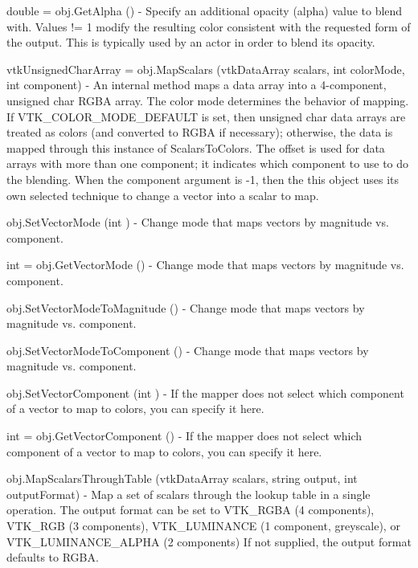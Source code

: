 \begin{DoxyItemize}
\item {\ttfamily double = obj.\-Get\-Alpha ()} -\/ Specify an additional opacity (alpha) value to blend with. Values != 1 modify the resulting color consistent with the requested form of the output. This is typically used by an actor in order to blend its opacity.  
\item {\ttfamily vtk\-Unsigned\-Char\-Array = obj.\-Map\-Scalars (vtk\-Data\-Array scalars, int color\-Mode, int component)} -\/ An internal method maps a data array into a 4-\/component, unsigned char R\-G\-B\-A array. The color mode determines the behavior of mapping. If V\-T\-K\-\_\-\-C\-O\-L\-O\-R\-\_\-\-M\-O\-D\-E\-\_\-\-D\-E\-F\-A\-U\-L\-T is set, then unsigned char data arrays are treated as colors (and converted to R\-G\-B\-A if necessary); otherwise, the data is mapped through this instance of Scalars\-To\-Colors. The offset is used for data arrays with more than one component; it indicates which component to use to do the blending. When the component argument is -\/1, then the this object uses its own selected technique to change a vector into a scalar to map.  
\item {\ttfamily obj.\-Set\-Vector\-Mode (int )} -\/ Change mode that maps vectors by magnitude vs. component.  
\item {\ttfamily int = obj.\-Get\-Vector\-Mode ()} -\/ Change mode that maps vectors by magnitude vs. component.  
\item {\ttfamily obj.\-Set\-Vector\-Mode\-To\-Magnitude ()} -\/ Change mode that maps vectors by magnitude vs. component.  
\item {\ttfamily obj.\-Set\-Vector\-Mode\-To\-Component ()} -\/ Change mode that maps vectors by magnitude vs. component.  
\item {\ttfamily obj.\-Set\-Vector\-Component (int )} -\/ If the mapper does not select which component of a vector to map to colors, you can specify it here.  
\item {\ttfamily int = obj.\-Get\-Vector\-Component ()} -\/ If the mapper does not select which component of a vector to map to colors, you can specify it here.  
\item {\ttfamily obj.\-Map\-Scalars\-Through\-Table (vtk\-Data\-Array scalars, string output, int output\-Format)} -\/ Map a set of scalars through the lookup table in a single operation. The output format can be set to V\-T\-K\-\_\-\-R\-G\-B\-A (4 components), V\-T\-K\-\_\-\-R\-G\-B (3 components), V\-T\-K\-\_\-\-L\-U\-M\-I\-N\-A\-N\-C\-E (1 component, greyscale), or V\-T\-K\-\_\-\-L\-U\-M\-I\-N\-A\-N\-C\-E\-\_\-\-A\-L\-P\-H\-A (2 components) If not supplied, the output format defaults to R\-G\-B\-A.  

\end{DoxyItemize}
